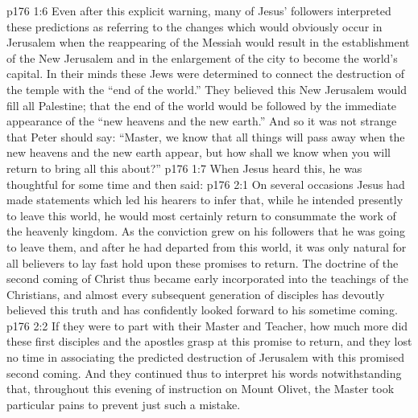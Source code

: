 \vs p176 1:6 Even after this explicit warning, many of Jesus’ followers interpreted these predictions as referring to the changes which would obviously occur in Jerusalem when the reappearing of the Messiah would result in the establishment of the New Jerusalem and in the enlargement of the city to become the world’s capital. In their minds these Jews were determined to connect the destruction of the temple with the “end of the world.” They believed this New Jerusalem would fill all Palestine; that the end of the world would be followed by the immediate appearance of the “new heavens and the new earth.” And so it was not strange that Peter should say: “Master, we know that all things will pass away when the new heavens and the new earth appear, but how shall we know when you will return to bring all this about?”
\vs p176 1:7 When Jesus heard this, he was thoughtful for some time and then said: 
\vs p176 2:1 On several occasions Jesus had made statements which led his hearers to infer that, while he intended presently to leave this world, he would most certainly return to consummate the work of the heavenly kingdom. As the conviction grew on his followers that he was going to leave them, and after he had departed from this world, it was only natural for all believers to lay fast hold upon these promises to return. The doctrine of the second coming of Christ thus became early incorporated into the teachings of the Christians, and almost every subsequent generation of disciples has devoutly believed this truth and has confidently looked forward to his sometime coming.
\vs p176 2:2 If they were to part with their Master and Teacher, how much more did these first disciples and the apostles grasp at this promise to return, and they lost no time in associating the predicted destruction of Jerusalem with this promised second coming. And they continued thus to interpret his words notwithstanding that, throughout this evening of instruction on Mount Olivet, the Master took particular pains to prevent just such a mistake.
